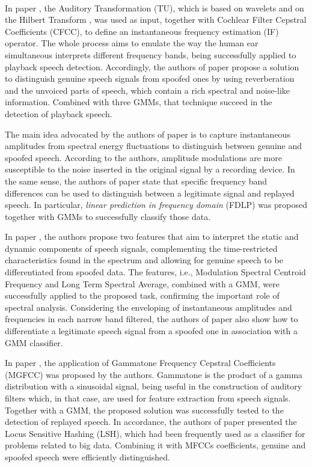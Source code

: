 \\
\par In paper \cite{Patel2015}, the Auditory Transformation (TU), which is based on wavelets and on the Hilbert Transform \cite{johansson1999hilbert} \cite{kschischang2006hilbert}, was used as input, together with Cochlear Filter Cepstral Coefficients (CFCC), to define an instantaneous frequency estimation (IF) operator. The whole process aims to emulate the way the human ear simultaneous interprets different frequency bands, being successfully applied to playback speech detection. Accordingly, the authors of paper \cite{ISI:000490497200068} propose a solution to distinguish genuine speech signals from spoofed ones by using reverberation and the unvoiced parts of speech, which contain a rich spectral and noise-like information. Combined with three GMMs, that technique succeed in the detection of playback speech.	
\\		
\par The main idea advocated by the authors of paper \cite{ISI:000465363900136} is to capture instantaneous amplitudes from spectral energy fluctuations to distinguish between genuine and spoofed speech. According to the authors, amplitude modulations are more susceptible to the noise inserted in the original signal by a recording device. In the same sense, the authors of paper \cite{ISI:000465363900139} state that specific frequency band differences can be used to distinguish between a legitimate signal and replayed speech. In particular, \textit{linear prediction in frequency domain} (FDLP) was proposed together with GMMs to successfully classify those data.
\\
\par In paper \cite{Suthokumar2018}, the authors propose two features that aim to interpret the static and dynamic components of speech signals, complementing the time-restricted characteristics found in the spectrum and allowing for genuine speech to be differentiated from spoofed data. The features, i.e., Modulation Spectral Centroid Frequency and Long Term Spectral Average, combined with a GMM, were successfully applied to the proposed task, confirming the important role of spectral analysis. Considering the enveloping of instantaneous amplitudes and frequencies in each narrow band filtered, the authors of paper \cite{ISI:000458728700054} also show how to differentiate a legitimate speech signal from a spoofed one in association with a GMM classifier.
\\
\par In paper \cite{ISI:000392503100008}, the application of Gammatone Frequency Cepstral Coefficients (MGFCC) was proposed by the authors. Gammatone is the product of a gamma distribution with a sinusoidal signal, being useful in the construction of auditory filters which, in that case, are used for feature extraction from speech signals. Together with a GMM, the proposed solution was successfully tested to the detection of replayed speech. In accordance, the authors of paper \cite{8396208} presented the Locus Sensitive Hashing (LSH), which had been frequently used as a classifier for problems related to big data. Combining it with MFCCs coefficients, genuine and spoofed speech were efficiently distinguished.	
